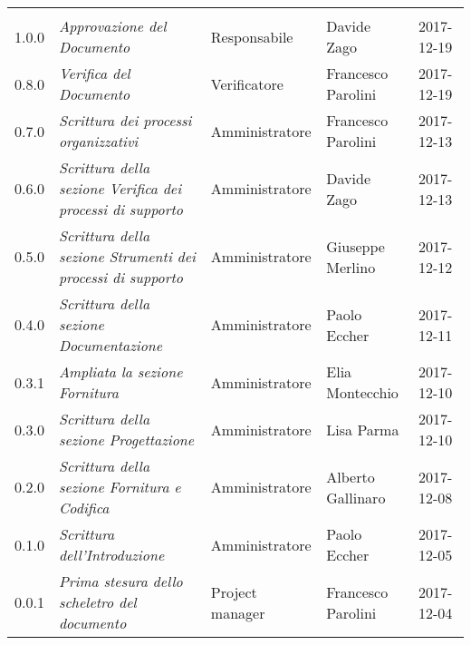 \newpage 
\section*{}
\begin{table}[H]
	\centering
	\begin{tabular}{p{2cm}|C{4cm}|C{3cm}|R{3cm}|R{2cm}}
		
		 &  & &  & \\
		
		
		1.0.0  & \emph{Approvazione del Documento} & Responsabile & Davide Zago &  2017-12-19 \\
		\hline
		
		0.8.0  &  \emph{Verifica del Documento} & Verificatore & Francesco Parolini & 2017-12-19 \\
		\hline
		
		0.7.0  & \emph{Scrittura dei processi organizzativi}  & Amministratore & Francesco Parolini & 2017-12-13\\
		\hline
		
		0.6.0  & \emph{Scrittura della sezione Verifica dei processi di supporto} &  Amministratore & Davide Zago  & 2017-12-13 \\
		\hline
		
		0.5.0  & \emph{Scrittura della sezione Strumenti dei processi di supporto} & Amministratore & Giuseppe Merlino & 2017-12-12\\
		\hline
		
	   	0.4.0  &\emph{Scrittura della sezione Documentazione}& Amministratore & Paolo Eccher  & 2017-12-11 \\
		\hline
		
		 0.3.1 & \emph{Ampliata la sezione Fornitura}& Amministratore & Elia Montecchio & 2017-12-10 \\
		\hline
		
		0.3.0 & \emph{Scrittura della sezione Progettazione} & Amministratore & Lisa Parma & 2017-12-10 \\
		\hline
					
		0.2.0 & \emph{Scrittura della sezione Fornitura e Codifica} & Amministratore & Alberto Gallinaro & 2017-12-08 \\
		\hline
		
		0.1.0 & \emph{Scrittura dell'Introduzione} & Amministratore & Paolo Eccher & 2017-12-05 \\
		\hline
		
		0.0.1 &\emph{Prima stesura dello scheletro del documento} &  Project manager & Francesco Parolini & 2017-12-04 \\
	

	\end{tabular}
	
\end{table}


\clearpage